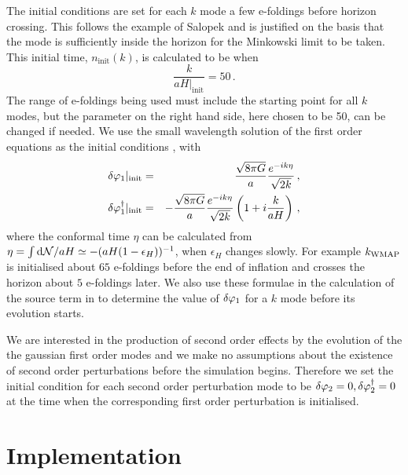 The initial conditions are set for each $k$ mode a few e-foldings
before horizon crossing. This follows the example of Salopek
\etal
\cite{Salopek:1988qh} and is justified on the basis that the mode is
sufficiently inside the
horizon for the Minkowski limit to be taken. This initial time,
$n_{\mathrm{init}}(k)$, is calculated to be when
%  
\begin{equation}
 \frac{k}{aH|_{\mathrm{init}}} = 50 \,.
\end{equation}
%
The range of e-foldings being used must include the starting point for
all $k$ modes, but the parameter on the right hand side, here chosen to
be 50, can be changed if needed.  We use the small wavelength solution
of the first order equations as the initial conditions \cite{Salopek:1988qh}, with
%
\begin{eqnarray}
\label{eq:foics}
 \delta\varphi_{1}|_{\mathrm{init}} &=& \frac{\sqrt{8\pi G}}{a}
\frac{e^{-i k\eta}}{\sqrt{2k}} \,,\\
 \delta\varphi_{1}^{\dagger}|_{\mathrm{init}} &=& -\frac{\sqrt{8\pi G}}{a}
\frac{e^{-i k\eta}}{\sqrt{2k}} \left(1 + i \frac{k}{a H}\right) \,,
\end{eqnarray}
%
where the conformal time $\eta$ can be calculated from $\eta=\int \mathrm{d}\mathcal{N}/aH \simeq
-(aH(1-\epsilon_H))^{-1}$, when $\epsilon_H$ changes slowly. For example $k_\mathrm{WMAP}$ is initialised
about $65$ e-foldings before the end of inflation and crosses the horizon about $5$ e-foldings
later.
We also use these formulae in the calculation of the source term in  to
determine the value of $\delta\varphi_{1}$ for a $k$ mode before its evolution starts.


We are interested in the production of second order effects by the
evolution of the the gaussian first order modes and we make no
assumptions about the existence of second order perturbations before
the simulation begins. Therefore we set the initial condition for each second order
perturbation mode to be $\delta\varphi_{2}=0, \delta\varphi_{2}^{\dagger}=0$ at
the time when the corresponding first order perturbation is initialised.



\section{Implementation} 
\label{sec:impl-num}


